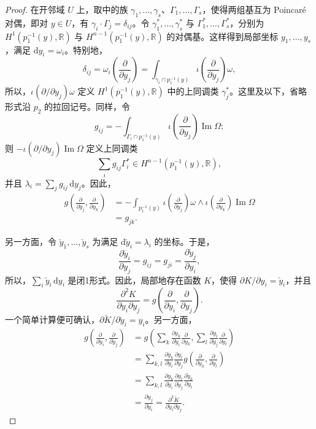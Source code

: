 \begin{proof}
在开邻域 $U$ 上，取中的族 $\gamma_1,\ldots,\gamma_s$、$\Gamma_1,\ldots,\Gamma_s$，使得两组基互为 Poincaré 对偶，即对 $y\in U$，有 $\gamma_i\cdot\Gamma_j=\delta_{ij}$。令 $\gamma_1^*,\ldots,\gamma_s^*$ 与 $\Gamma_1^*,\ldots,\Gamma_s^*$，分别为 $H^1(p_1^{-1}(y),\mathbb R)$ 与 $H^{n-1}(p_1^{-1}(y),\mathbb R)$ 的对偶基。这样得到局部坐标 $y_1,\ldots,y_s$，满足 $\mathrm dy_i=\omega_i$。特别地，
\[
\delta_{ij}=\omega_i\!\left(\frac{\partial}{\partial y_j}\right)
=\int_{\gamma_i\cap p_1^{-1}(y)}
\iota\!\left(\frac{\partial}{\partial y_j}\right)\omega,
\]
所以，$\iota(\partial/\partial y_j)\omega$ 定义 $H^1(p_1^{-1}(y),\mathbb R)$ 中的上同调类 $\gamma_j^*$。这里及以下，省略形式沿 $p_2$ 的拉回记号。同样，令
\[
g_{ij}=-\int_{\Gamma_i\cap p_1^{-1}(y)}
\iota\!\left(\frac{\partial}{\partial y_j}\right)\operatorname{Im}\Omega;
\]
则 $-\iota(\partial/\partial y_j)\operatorname{Im}\Omega$ 定义上同调类
\[
\sum_i g_{ij}\Gamma_i^*\in H^{n-1}(p_1^{-1}(y),\mathbb R),
\]
并且 $\lambda_i=\sum_jg_{ij}\,\mathrm dy_j$。因此，
\[
\begin{aligned}
g\!\left(\frac{\partial}{\partial y_j},\frac{\partial}{\partial y_k}\right)
&=-\int_{p_1^{-1}(y)}
\iota\!\left(\frac{\partial}{\partial y_j}\right)\omega
\wedge\iota\!\left(\frac{\partial}{\partial y_k}\right)\operatorname{Im}\Omega\\
&=g_{jk}.
\end{aligned}
\]

另一方面，令 $\check y_1,\ldots,\check y_s$ 为满足 $\mathrm d\check y_i=\lambda_i$ 的坐标。于是，
\[
\frac{\partial\check y_i}{\partial y_j}
=g_{ij}=g_{ji}=\frac{\partial\check y_j}{\partial y_i},
\]
所以，$\sum_i\check y_i\,\mathrm dy_i$ 是闭1形式。因此，局部地存在函数 $K$，使得 $\partial K/\partial y_i=\check y_i$，并且
\[
\frac{\partial^2K}{\partial y_i\partial y_j}
=g\!\left(\frac{\partial}{\partial y_i},\frac{\partial}{\partial y_j}\right).
\]
一个简单计算便可确认，$\partial\check K/\partial\check y_i=y_i$。另一方面，
\[
\begin{aligned}
g\!\left(\frac{\partial}{\partial\check y_i},\frac{\partial}{\partial\check y_j}\right)
&=g\!\left(\sum_k\frac{\partial y_k}{\partial\check y_i}\frac{\partial}{\partial y_k},
\sum_l\frac{\partial y_l}{\partial\check y_j}\frac{\partial}{\partial y_l}\right)\\
&=\sum_{k,l}\frac{\partial y_k}{\partial\check y_i}
\frac{\partial y_l}{\partial\check y_j}
g\!\left(\frac{\partial}{\partial y_k},\frac{\partial}{\partial y_l}\right)\\
&=\sum_{k,l}\frac{\partial y_k}{\partial\check y_i}
\frac{\partial y_l}{\partial\check y_j}\frac{\partial\check y_k}{\partial y_l}\\
&=\frac{\partial y_j}{\partial\check y_i}
=\frac{\partial^2\check K}{\partial\check y_i\partial\check y_j}.
\end{aligned}
\]
\end{proof}

